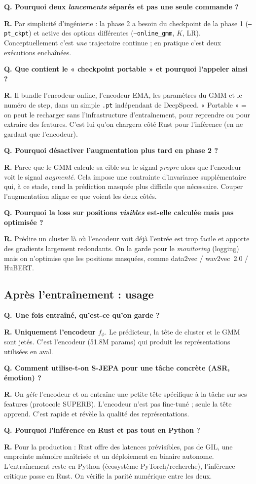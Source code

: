 \documentclass[11pt,a4paper]{article}
\newcommand{\faq}[2]{%
  \par\medskip
  \begin{faqbox}
  \textbf{Q. #1}\par\smallskip
  \textbf{R.} #2
  \end{faqbox}
}
\newcommand{\code}[1]{\texttt{#1}}
\newcommand{\file}[1]{\texttt{#1}}
\begin{document}
\faq{Pourquoi deux \emph{lancements} séparés et pas une seule commande ?}{%
Par simplicité d'ingénierie : la phase 2 a besoin du checkpoint de la phase
1 (\code{--pt\_ckpt}) et active des options différentes (\code{--online\_gmm},
$K$, LR). Conceptuellement c'est \emph{une} trajectoire continue ; en
pratique c'est deux exécutions enchaînées.}

\faq{Que contient le « checkpoint portable » et pourquoi l'appeler ainsi ?}{%
Il bundle l'encodeur online, l'encodeur EMA, les paramètres du GMM et le
numéro de step, dans un simple \file{.pt} indépendant de DeepSpeed. «
Portable » = on peut le recharger sans l'infrastructure d'entraînement,
pour reprendre ou pour extraire des features. C'est lui qu'on chargera côté
Rust pour l'inférence (en ne gardant que l'encodeur).}

\faq{Pourquoi désactiver l'augmentation plus tard en phase 2 ?}{%
Parce que le GMM calcule sa cible sur le signal \emph{propre} alors que
l'encodeur voit le signal \emph{augmenté}. Cela impose une contrainte
d'invariance supplémentaire qui, à ce stade, rend la prédiction masquée
plus difficile que nécessaire. Couper l'augmentation aligne ce que voient
les deux côtés.}

\faq{Pourquoi la loss sur positions \emph{visibles} est-elle calculée mais
pas optimisée ?}{%
Prédire un cluster là où l'encodeur voit déjà l'entrée est trop facile et
apporte des gradients largement redondants. On la garde pour le
\emph{monitoring} (logging) mais on n'optimise que les positions masquées,
comme data2vec / wav2vec~2.0 / HuBERT.}

\subsection{Après l'entraînement : usage}

\faq{Une fois entraîné, qu'est-ce qu'on garde ?}{%
\textbf{Uniquement l'encodeur $f_\phi$}. Le prédicteur, la tête de cluster
et le GMM sont jetés. C'est l'encodeur (51.8M params) qui produit les
représentations utilisées en aval.}

\faq{Comment utilise-t-on S-JEPA pour une tâche concrète (ASR, émotion) ?}{%
On \emph{gèle} l'encodeur et on entraîne une petite tête spécifique à la
tâche sur ses features (protocole SUPERB). L'encodeur n'est pas
fine-tuné ; seule la tête apprend. C'est rapide et révèle la qualité des
représentations.}

\faq{Pourquoi l'inférence en Rust et pas tout en Python ?}{%
Pour la production : Rust offre des latences prévisibles, pas de GIL, une
empreinte mémoire maîtrisée et un déploiement en binaire autonome.
L'entraînement reste en Python (écosystème PyTorch/recherche), l'inférence
critique passe en Rust. On vérifie la parité numérique entre les deux.}
\end{document}
